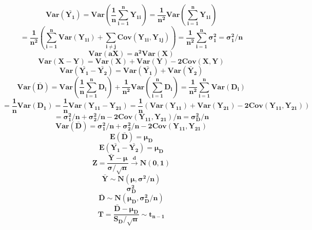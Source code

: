 \documentclass[12pt,portrait,semhelv,semrot]{article}
\begin{document}
{{$$\boldsymbol{Var\left(\bar{Y_1}\right) = Var\left(\frac{1}{n}\sum_{i=1}^{n}Y_{1i}\right) = \frac{1}{n^2}Var\left(\sum_{i=1}^{n}Y_{1i}\right)}$$
$$\boldsymbol{= \frac{1}{n^2}\left(\sum_{i=1}^{n}Var(Y_{1i}) + \sum_{i\neq j} Cov(Y_{1i}, Y_{1j})\right) = \frac{1}{n^2}\sum_{i=1}^{n}\sigma_1^2 = \sigma_1^2/n}$$
$$\boldsymbol{Var(aX) = a^2 Var(X)}$$
$$\boldsymbol{Var(X-Y) = Var(X) + Var(Y) -2Cov(X,Y)}$$
$$\boldsymbol{Var\left(\bar{Y_1}-\bar{Y_2}\right) = Var\left(\bar{Y_1}\right) + Var\left(\bar{Y}_2\right)}$$
$$\boldsymbol{Var\left(\bar{D}\right) = Var\left(\frac{1}{n}\sum_{i=1}^{n}D_i\right) + \frac{1}{n^2}Var\left(\sum_{i=1}^{n}D_i\right)= \frac{1}{n^2}\sum_{i=1}^{n}Var(D_i)}$$
$$\boldsymbol{ = \frac{1}{n}Var(D_1) = \frac{1}{n}Var(Y_{11}-Y_{21}) = \frac{1}{n}\left(Var(Y_{11})+Var(Y_{21}) -2Cov(Y_{11}, Y_{21})\right)}$$
$$\boldsymbol{ = \sigma^2_1/n+\sigma^2_2/n-2Cov(Y_{11},Y_{21})/n = \sigma^2_D/n}$$
$$\boldsymbol{Var\left(\bar{D}\right) = \sigma^2_1/n+\sigma^2_2/n-2Cov(Y_{11},Y_{21})}$$
$$\boldsymbol{E\left(\bar{D}\right) = \mu_D}$$
$$\boldsymbol{E\left(\bar{Y_1}-\bar{Y_2}\right) = \mu_D}$$
$$\boldsymbol{Z = \frac{\bar{Y}-\mu}{\sigma/\sqrt{n}}\stackrel{d}\rightarrow N(0, 1)}$$
$$\boldsymbol{\bar{Y}\sim N(\mu, \sigma^2/n)}$$
$$\boldsymbol{\sigma^2_D}$$
$$\boldsymbol{\bar{D}\sim N(\mu_D, \sigma_D^2/n)}$$
$$\boldsymbol{T = \frac{\bar{D}-\mu_D}{S_D/\sqrt{n}}\sim t_{n-1}}$$
}
}
\end{document}
